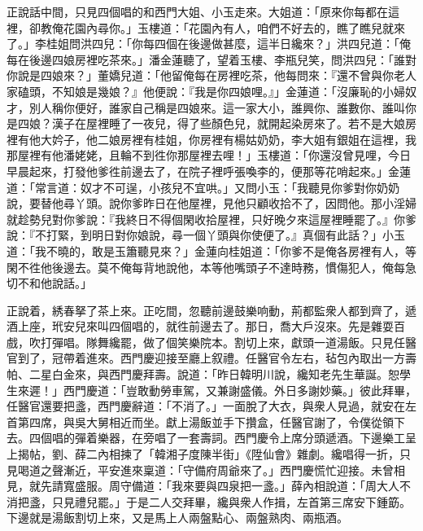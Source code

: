 正說話中間，只見四個唱的和西門大姐、小玉走來。大姐道：「原來你每都在這裡，卻教俺花園內尋你。」玉樓道：「花園內有人，咱們不好去的，瞧了瞧兒就來了。」李桂姐問洪四兒：「你每四個在後邊做甚麼，這半日纔來？」洪四兒道：「俺每在後邊四娘房裡吃茶來。」潘金蓮聽了，望着玉樓、李瓶兒笑，問洪四兒：「誰對你說是四娘來？」董嬌兒道：「他留俺每在房裡吃茶，他每問來：『還不曾與你老人家磕頭，不知娘是幾娘？』他便說：『我是你四娘哩。』」金蓮道：「沒廉恥的小婦奴才，別人稱你便好，誰家自己稱是四娘來。這一家大小，誰興你、誰數你、誰叫你是四娘？漢子在屋裡睡了一夜兒，得了些顏色兒，就開起染房來了。若不是大娘房裡有他大妗子，他二娘房裡有桂姐，你房裡有楊姑奶奶，李大姐有銀姐在這裡，我那屋裡有他潘姥姥，且輪不到徃你那屋裡去哩！」{}{}玉樓道：「你還沒曾見哩，今日早晨起來，打發他爹徃前邊去了，在院子裡呼張喚李的，便那等花哨起來。」金蓮道：「常言道：奴才不可逞，小孩兒不宜哄。」{}又問小玉：「我聽見你爹對你奶奶說，要替他尋丫頭。說你爹昨日在他屋裡，見他只顧收拾不了，因問他。那小淫婦就趁勢兒對你爹說：『我終日不得個閑收拾屋裡，只好晚夕來這屋裡睡罷了。』你爹說：『不打緊，到明日對你娘說，尋一個丫頭與你使便了。』真個有此話？」{}小玉道：「我不曉的，敢是玉簫聽見來？」金蓮向桂姐道：「你爹不是俺各房裡有人，等閑不徃他後邊去。莫不俺每背地說他，本等他嘴頭子不達時務，慣傷犯人，俺每急切不和他說話。」{}

正說着，綉春拏了茶上來。正吃間，忽聽前邊鼓樂响動，荊都監衆人都到齊了，遞酒上座，玳安兒來叫四個唱的，就徃前邊去了。那日，喬大戶沒來。先是雜耍百戲，吹打彈唱。隊舞纔罷，做了個笑樂院本。割切上來，獻頭一道湯飯。只見任醫官到了，冠帶着進來。西門慶迎接至廳上叙禮。任醫官令左右，毡包內取出一方壽帕、二星白金來，與西門慶拜壽。說道：「昨日韓明川說，纔知老先生華誕。恕學生來遲！」西門慶道：「豈敢動勞車駕，又兼謝盛儀。外日多謝妙藥。」彼此拜畢，任醫官還要把盞，西門慶辭道：「不消了。」一面脫了大衣，與衆人見過，就安在左首第四席，與吳大舅相近而坐。獻上湯飯並手下攢盒，任醫官謝了，令僕從領下去。四個唱的彈着樂器，在旁唱了一套壽詞。西門慶令上席分頭遞酒。下邊樂工呈上揭帖，劉、薛二內相揀了「韓湘子度陳半街」《陞仙會》雜劇。纔唱得一折，只見喝道之聲漸近，平安進來稟道：「守備府周爺來了。」西門慶慌忙迎接。未曾相見，就先請寬盛服。周守備道：「我來要與四泉把一盞。」薛內相說道：「周大人不消把盞，只見禮兒罷。」于是二人交拜畢，纔與衆人作揖，左首第三席安下鍾筯。下邊就是湯飯割切上來，又是馬上人兩盤點心、兩盤熟肉、兩瓶酒。

